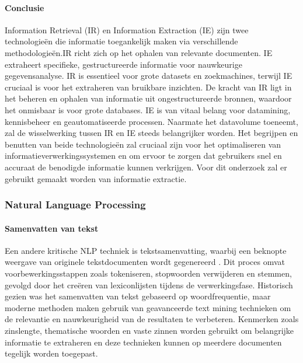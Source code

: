 \paragraph{Conclusie}
Information Retrieval (IR) en Information Extraction (IE) zijn twee technologieën die informatie toegankelijk maken via verschillende methodologieën.IR richt zich op het ophalen van relevante documenten. IE extraheert specifieke, gestructureerde informatie voor nauwkeurige gegevensanalyse. IR is essentieel voor grote datasets en zoekmachines, terwijl IE cruciaal is voor het extraheren van bruikbare inzichten. De kracht van IR ligt in het beheren en ophalen van informatie uit ongestructureerde bronnen, waardoor het onmisbaar is voor grote databases. IE is van vitaal belang voor datamining, kennisbeheer en geautomatiseerde processen. Naarmate het datavolume toeneemt, zal de wisselwerking tussen IR en IE steeds belangrijker worden. Het begrijpen en benutten van beide technologieën zal cruciaal zijn voor het optimaliseren van informatieverwerkingssystemen en om ervoor te zorgen dat gebruikers snel en accuraat de benodigde informatie kunnen verkrijgen. Voor dit onderzoek zal er gebruikt gemaakt worden van informatie extractie.

\subsubsection{Natural Language Processing}
\paragraph{Samenvatten van tekst }

Een andere kritische NLP techniek is tekstsamenvatting, waarbij een beknopte weergave van originele tekstdocumenten wordt gegenereerd \autocite{Talib2016TextMining}. Dit proces omvat voorbewerkingsstappen zoals tokeniseren, stopwoorden verwijderen en stemmen, gevolgd door het creëren van lexiconlijsten tijdens de verwerkingsfase. Historisch gezien was het samenvatten van tekst gebaseerd op woordfrequentie, maar moderne methoden maken gebruik van geavanceerde text mining technieken om de relevantie en nauwkeurigheid van de resultaten te verbeteren. Kenmerken zoals zinslengte, thematische woorden en vaste zinnen worden gebruikt om belangrijke informatie te extraheren en deze technieken kunnen op meerdere documenten tegelijk worden toegepast.


